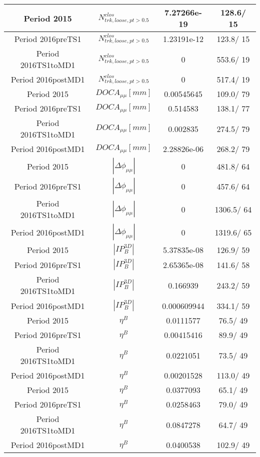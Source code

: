 \documentclass{article}
\begin{document}
\begin{longtable}{c|c|c|c}
\hline
 Period 2015 & $N^{clos}_{trk, loose, pt>0.5}$ & 7.27266e-19 & 128.6/ 15\\
\hline
 Period 2016preTS1 & $N^{clos}_{trk, loose, pt>0.5}$ & 1.23191e-12 & 123.8/ 15\\
\hline
 Period 2016TS1toMD1 & $N^{clos}_{trk, loose, pt>0.5}$ & 0 & 553.6/ 19\\
\hline
 Period 2016postMD1 & $N^{clos}_{trk, loose, pt>0.5}$ & 0 & 517.4/ 19\\
\hline
 Period 2015 & $DOCA_{\mu\mu} [mm]$ & 0.00545645 & 109.0/ 79\\
\hline
 Period 2016preTS1 & $DOCA_{\mu\mu} [mm]$ & 0.514583 & 138.1/ 77\\
\hline
 Period 2016TS1toMD1 & $DOCA_{\mu\mu} [mm]$ & 0.002835 & 274.5/ 79\\
\hline
 Period 2016postMD1 & $DOCA_{\mu\mu} [mm]$ & 2.28826e-06 & 268.2/ 79\\
\hline
 Period 2015 & $|\Delta\phi_{\mu\mu}|$ & 0 & 481.8/ 64\\
\hline
 Period 2016preTS1 & $|\Delta\phi_{\mu\mu}|$ & 0 & 457.6/ 64\\
\hline
 Period 2016TS1toMD1 & $|\Delta\phi_{\mu\mu}|$ & 0 & 1306.5/ 64\\
\hline
 Period 2016postMD1 & $|\Delta\phi_{\mu\mu}|$ & 0 & 1319.6/ 65\\
\hline
 Period 2015 & $|IP_{B}^{3D}|$ & 5.37835e-08 & 126.9/ 59\\
\hline
 Period 2016preTS1 & $|IP_{B}^{3D}|$ & 2.65365e-08 & 141.6/ 58\\
\hline
 Period 2016TS1toMD1 & $|IP_{B}^{3D}|$ & 0.166939 & 243.2/ 59\\
\hline
 Period 2016postMD1 & $|IP_{B}^{3D}|$ & 0.000609944 & 334.1/ 59\\
\hline
 Period 2015 & $\eta^{B}$ & 0.0111577 &  76.5/ 49\\
\hline
 Period 2016preTS1 & $\eta^{B}$ & 0.00415416 &  89.9/ 49\\
\hline
 Period 2016TS1toMD1 & $\eta^{B}$ & 0.0221051 &  73.5/ 49\\
\hline
 Period 2016postMD1 & $\eta^{B}$ & 0.00201528 & 113.0/ 49\\
\hline
 Period 2015 & $\eta^{B}$ & 0.0377093 &  65.1/ 49\\
\hline
 Period 2016preTS1 & $\eta^{B}$ & 0.0258463 &  79.0/ 49\\
\hline
 Period 2016TS1toMD1 & $\eta^{B}$ & 0.0847278 &  64.7/ 49\\
\hline
 Period 2016postMD1 & $\eta^{B}$ & 0.0400538 & 102.9/ 49\\

\end{longtable}
\end{document}

